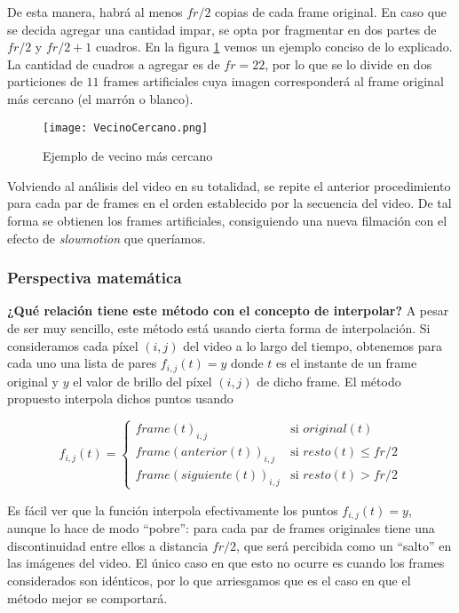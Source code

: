 De esta manera, habr\'a al menos $fr/2$ copias de cada frame original. En caso que se decida agregar una cantidad impar, se opta por fragmentar en dos partes de $fr/2$ y $fr/2+1$ cuadros. En la figura \ref{fig:vecino} vemos un ejemplo conciso de lo explicado. La cantidad de cuadros a agregar es de $fr = 22$, por lo que se lo divide en dos particiones de $11$ frames artificiales cuya imagen corresponder\'a al frame original m\'as cercano (el marr\'on o blanco).

\begin{figure}[h!]
  \centering
    \texttt{[image: VecinoCercano.png]}
     \caption{Ejemplo de vecino m\'as cercano}\label{fig:vecino}
\end{figure}
\noindent

Volviendo al an\'alisis del video en su totalidad, se repite el anterior procedimiento para cada par de frames en el orden establecido por la secuencia del video. De tal forma se obtienen los frames artificiales, consiguiendo una nueva filmaci\'on con el efecto de \textit{slowmotion} que queríamos. 

\subsubsection*{\bf{Perspectiva matem\'atica}}

\textbf{¿Qu\'e relaci\'on tiene este m\'etodo con el concepto de interpolar?} A pesar de ser muy sencillo, este método está usando cierta forma de interpolación. Si consideramos cada píxel $(i, j)$ del video a lo largo del tiempo, obtenemos para cada uno una lista de pares $f_{i,j}(t)=y$ donde $t$ es el instante de un frame original y $y$ el valor de brillo del píxel $(i,j)$ de dicho frame. El método propuesto interpola dichos puntos usando 

\[
f_{i,j}(t) = 
\left\{
    \begin{array}{ll}
        frame(t)_{i,j} & \mbox{si } original(t) \\
        frame(anterior(t))_{i,j} & \mbox{si } resto(t) \leq fr/2 \\     
        frame(siguiente(t))_{i,j} & \mbox{si } resto(t) > fr/2
    \end{array}
\right.
\]

Es fácil ver que la función interpola efectivamente los puntos $f_{i,j}(t)=y$, aunque lo hace de modo ``pobre'': para cada par de frames originales tiene una discontinuidad entre ellos a distancia $fr/2$, que será percibida como un ``salto'' en las imágenes del video. El único caso en que esto no ocurre es cuando los frames considerados son idénticos, por lo que arriesgamos que es el caso en que el método mejor se comportará.

